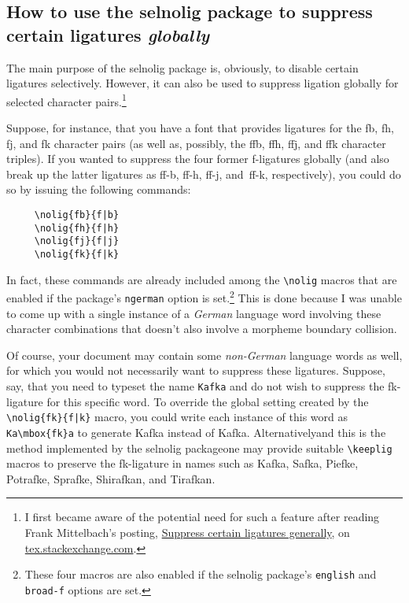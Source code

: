 \documentclass[12pt]{article}
\newcommand{\pkg}[1]{\textsf{#1}}
\newcommand{\opt}[1]{\texttt{#1}}
\newcommand{\cmmd}[1]{\texttt{\textbackslash #1}}
\begin{document}
\subsection[How to use the selnolig package to suppress certain ligatures globally]{How to use the selnolig package to suppress certain ligatures \emph{globally}}
\label{sec:global-nolig}


The main purpose of the \pkg{selnolig} package is, obviously, to disable certain ligatures selectively. However, it can also be used to suppress ligation globally for selected character pairs.\footnote{I first became aware of the potential need for such a feature after reading Frank Mittelbach's posting, \href{http://tex.stackexchange.com/q/61042/5001}{Suppress certain ligatures generally}, on \url{tex.stackexchange.com}.}

\bgroup \ebg

Suppose, for instance, that you have a font that provides ligatures for the \mbox{fb}, \mbox{fh}, \mbox{fj}, and \mbox{fk} character pairs (as well as, possibly, the \mbox{ffb}, \mbox{ffh}, \mbox{ffj}, and \mbox{ffk} character triples). If you wanted to suppress the four former f-ligatures globally (and also break up the latter ligatures as ff-b, ff-h, ff-j, and~ff-k, respectively), you could do so by issuing the following commands: \egroup
\begin{Verbatim}
     \nolig{fb}{f|b}
     \nolig{fh}{f|h}
     \nolig{fj}{f|j}
     \nolig{fk}{f|k}
\end{Verbatim}
In fact, these commands are already included among the \cmmd{nolig} macros that are enabled if the package's \opt{ngerman} option is set.\footnote{These four macros are also enabled if the \pkg{selnolig} package's \opt{english} and \opt{broad-f} options are set.} This is done because I was unable to come up with a single instance of a \emph{German} language word involving these character combinations that doesn't also involve a morpheme boundary collision.


Of course, your document may contain some \emph{non-German} language words as well, for which you would not necessarily want to suppress these ligatures. Suppose, say, that you need to typeset the name \opt{Kafka} and do not wish to suppress the {\ebg \mbox{fk}}-ligature for this specific word. To override the global setting created by the \Verb+\nolig{fk}{f|k}+ macro, you could write each instance of this word as 
\Verb+Ka\mbox{fk}a+
to generate Ka\mbox{\ebg \mbox{fk}}a instead of Kafka. Alternatively\textemdash and this is the method implemented by the \pkg{selnolig} package\textemdash one may provide suitable \cmmd{keeplig} macros to preserve the {\ebg\mbox{fk}}-ligature in names such as {\ebg Kafka, Safka, Piefke, Potrafke, Sprafke, Shirafkan, and Tirafkan}. 
\end{document}
